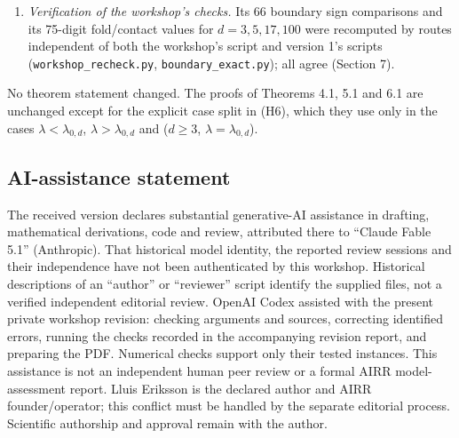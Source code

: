\documentclass[
  11pt,
  a4paper,
]{article}
\begin{document}
\begin{enumerate}
  explicitly that the note is standalone, which single statement it
  imports (Theorem A), that Lemma 3.1 is a contiguous relation of
  Kummer's function whose novelty lies in its use, and what a reader
  gains without 1D2Q. Lemma 2.1 (new) reproves the facts previously
  cited as 1D2Q eqs. (10), (11), (15); the direct reason for
  \(R_d(0)=+\infty\) is added in the proof of Theorem 5.1(f). The note
  is deliberately not merged with 1D2Q.
\item
  \emph{Verification of the workshop's checks.} Its 66 boundary sign
  comparisons and its 75-digit fold/contact values for \(d=3,\allowbreak{}5,\allowbreak{}17,\allowbreak{}100\)
  were recomputed by routes independent of both the workshop's script
  and version 1's scripts ({\small\texttt{workshop\_\allowbreak{}recheck.\allowbreak{}py}},
  {\small\texttt{boundary\_\allowbreak{}exact.\allowbreak{}py}}); all agree (Section 7).
\end{enumerate}

No theorem statement changed. The proofs of Theorems 4.1, 5.1 and 6.1
are unchanged except for the explicit case split in (H6), which they use
only in the cases \(\lambda<\lambda_{0,\allowbreak{}d}\), \(\lambda>\lambda_{0,\allowbreak{}d}\)
and (\(d\ge3\), \(\lambda=\lambda_{0,\allowbreak{}d}\)).

\subsection{AI-assistance statement}\label{ai-assistance-statement}

The received version declares substantial generative-AI assistance in
drafting, mathematical derivations, code and review, attributed there to
``Claude Fable 5.1'' (Anthropic). That historical model identity, the
reported review sessions and their independence have not been
authenticated by this workshop. Historical descriptions of an ``author''
or ``reviewer'' script identify the supplied files, not a verified
independent editorial review. OpenAI Codex assisted with the present
private workshop revision: checking arguments and sources, correcting
identified errors, running the checks recorded in the accompanying
revision report, and preparing the PDF. Numerical checks support only
their tested instances. This assistance is not an independent human peer
review or a formal AIRR model-assessment report. Lluis Eriksson is the
declared author and AIRR founder/operator; this conflict must be handled
by the separate editorial process. Scientific authorship and approval
remain with the author.
\end{document}
